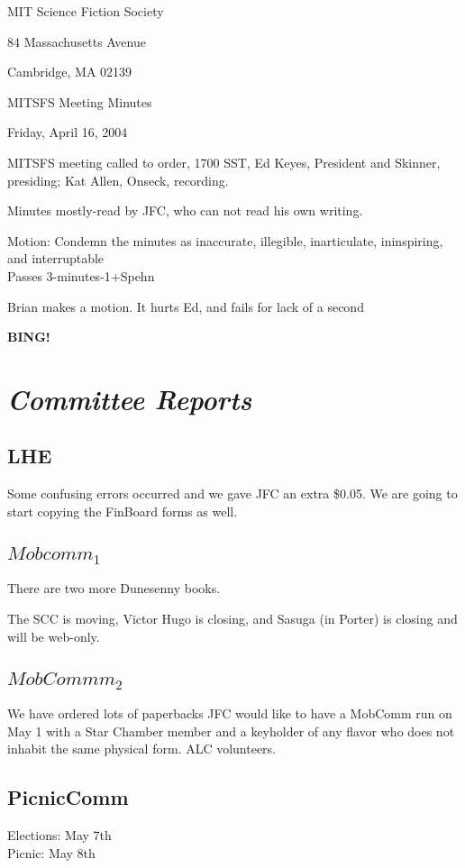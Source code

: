 \documentclass[10pt]{article}
\newcommand{\bing}{{\bf BING!} }
\newcommand{\goto}[1]{\bing \vskip 12pt \section*{{\em{#1}}}}
\begin{document}
\begin{center}

MIT Science Fiction Society 

84 Massachusetts Avenue

Cambridge, MA 02139

\vspace{12pt}

MITSFS Meeting Minutes 

Friday, April 16, 2004

\end{center}
 
\vspace{18pt}

\setlength{\parskip}{6pt}

\noindent
MITSFS meeting called to order, 1700 SST, Ed Keyes, President and
Skinner, presiding; Kat Allen,  Onseck, recording.

Minutes mostly-read by JFC, who can not read his own writing.

Motion: Condemn the minutes as inaccurate, illegible, inarticulate,
ininspiring, and interruptable\\
Passes 3-minutes-1+Spehn

Brian makes a motion. It hurts Ed, and fails for lack of a second

\goto{Committee Reports}
\subsection*{LHE}
Some confusing errors occurred and we gave JFC an extra \$0.05.  We are
going to start copying the FinBoard forms as well.
\subsection*{$Mobcomm_1$}
There are two more Dunesenny books.

The SCC is moving, Victor Hugo is closing, and Sasuga (in Porter) is
closing and will be web-only.

\subsection*{$MobCommm_2$}
We have ordered lots of paperbacks
JFC would like to have a MobComm run on May 1 with a Star Chamber
member and a keyholder of any flavor who does not inhabit the same
physical form. ALC volunteers.

\subsection*{PicnicComm}
Elections: May 7th\\
Picnic: May 8th
\end{document}
